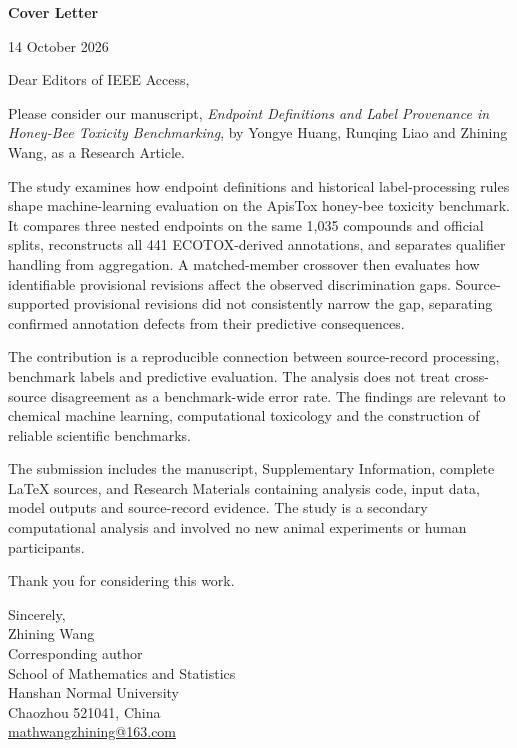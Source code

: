 \documentclass[11pt]{article}
\begin{document}
\textbf{Cover Letter}

14 October 2026

Dear Editors of IEEE Access,

Please consider our manuscript, \textit{Endpoint Definitions and Label Provenance in Honey-Bee Toxicity Benchmarking}, by Yongye Huang, Runqing Liao and Zhining Wang, as a Research Article.

The study examines how endpoint definitions and historical label-processing rules shape machine-learning evaluation on the ApisTox honey-bee toxicity benchmark. It compares three nested endpoints on the same 1,035 compounds and official splits, reconstructs all 441 ECOTOX-derived annotations, and separates qualifier handling from aggregation. A matched-member crossover then evaluates how identifiable provisional revisions affect the observed discrimination gaps. Source-supported provisional revisions did not consistently narrow the gap, separating confirmed annotation defects from their predictive consequences.

The contribution is a reproducible connection between source-record processing, benchmark labels and predictive evaluation. The analysis does not treat cross-source disagreement as a benchmark-wide error rate. The findings are relevant to chemical machine learning, computational toxicology and the construction of reliable scientific benchmarks.

The submission includes the manuscript, Supplementary Information, complete LaTeX sources, and Research Materials containing analysis code, input data, model outputs and source-record evidence. The study is a secondary computational analysis and involved no new animal experiments or human participants.

Thank you for considering this work.

Sincerely,\\
Zhining Wang\\
Corresponding author\\
School of Mathematics and Statistics\\
Hanshan Normal University\\
Chaozhou 521041, China\\
\href{mailto:mathwangzhining@163.com}{mathwangzhining@163.com}
\end{document}
